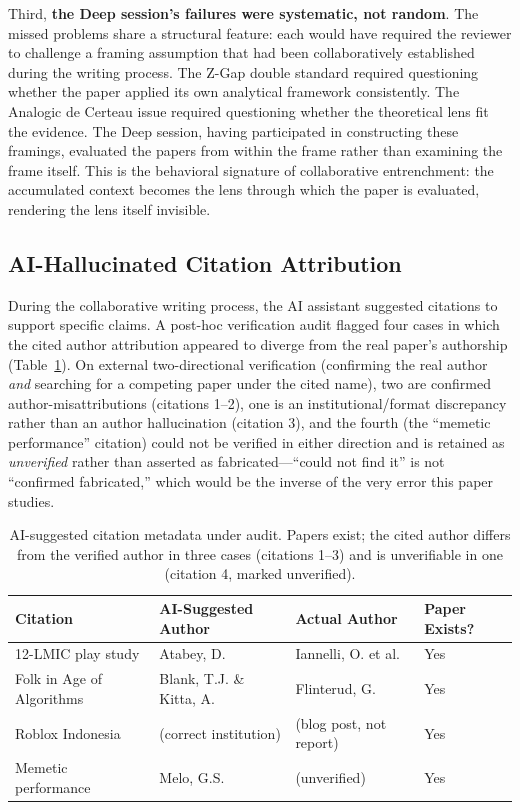 \documentclass[12pt]{article}
\begin{document}
Third, \textbf{the Deep session's failures were systematic, not random}. The missed problems share a structural feature: each would have required the reviewer to challenge a framing assumption that had been collaboratively established during the writing process. The Z-Gap double standard required questioning whether the paper applied its own analytical framework consistently. The Analogic de Certeau issue required questioning whether the theoretical lens fit the evidence. The Deep session, having participated in constructing these framings, evaluated the papers from within the frame rather than examining the frame itself. This is the behavioral signature of collaborative entrenchment: the accumulated context becomes the lens through which the paper is evaluated, rendering the lens itself invisible.

\subsection{AI-Hallucinated Citation Attribution}
\label{sec:hallucinated-citations}

During the collaborative writing process, the AI assistant suggested citations to support specific claims. A post-hoc verification audit flagged four cases in which the cited author attribution appeared to diverge from the real paper's authorship (Table~\ref{tab:hallucinated}). On external two-directional verification (confirming the real author \emph{and} searching for a competing paper under the cited name), two are confirmed author-misattributions (citations 1--2), one is an institutional/format discrepancy rather than an author hallucination (citation 3), and the fourth (the ``memetic performance'' citation) could not be verified in either direction and is retained as \emph{unverified} rather than asserted as fabricated---``could not find it'' is not ``confirmed fabricated,'' which would be the inverse of the very error this paper studies.

\begin{table}[htbp]
\centering
\caption{AI-suggested citation metadata under audit. Papers exist; the cited author differs from the verified author in three cases (citations 1--3) and is unverifiable in one (citation 4, marked unverified).}
\label{tab:hallucinated}
\begin{tabular}{p{3cm}p{3cm}p{3cm}l}
\toprule
Citation & AI-Suggested Author & Actual Author & Paper Exists? \\
\midrule
12-LMIC play study & Atabey, D. & Iannelli, O. et al. & Yes \\
Folk in Age of Algorithms & Blank, T.J. \& Kitta, A. & Flinterud, G. & Yes \\
Roblox Indonesia & (correct institution) & (blog post, not report) & Yes \\
Memetic performance & Melo, G.S. & (unverified) & Yes \\
\bottomrule
\end{tabular}
\end{table}
\end{document}
